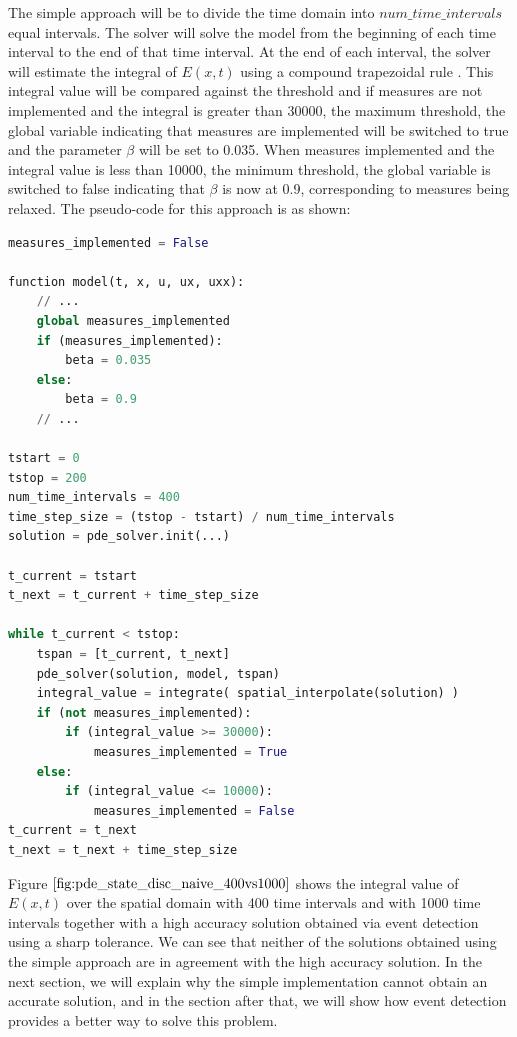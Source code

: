 The simple approach will be to divide the time domain into $num\_time\_intervals$ equal intervals. The solver will solve the model from the beginning of each time interval to the end of that time interval. At the end of each interval, the solver will estimate the integral of $E(x, t)$ using a compound trapezoidal rule \cite{heath2018scientific}. This integral value will be compared against the threshold and if measures are not implemented and the integral is greater than 30000, the maximum threshold, the global variable indicating that measures are implemented will be switched to true and the parameter $\beta$ will be set to 0.035. When measures implemented and the integral value is less than 10000, the minimum threshold, the global variable is switched to false indicating that $\beta$ is now at 0.9, corresponding to measures being relaxed. The pseudo-code for this approach is as shown:

\begin{minipage}{\linewidth}
\begin{lstlisting}[language=Python]
measures_implemented = False

function model(t, x, u, ux, uxx):
	// ...
	global measures_implemented
	if (measures_implemented):
		beta = 0.035
	else:
		beta = 0.9
	// ...

tstart = 0
tstop = 200
num_time_intervals = 400
time_step_size = (tstop - tstart) / num_time_intervals
solution = pde_solver.init(...)

t_current = tstart
t_next = t_current + time_step_size

while t_current < tstop:
	tspan = [t_current, t_next]
	pde_solver(solution, model, tspan)
	integral_value = integrate( spatial_interpolate(solution) )
	if (not measures_implemented):
		if (integral_value >= 30000): 
			measures_implemented = True
	else:
		if (integral_value <= 10000):
			measures_implemented = False
t_current = t_next
t_next = t_next + time_step_size
\end{lstlisting}
\end{minipage} 

Figure $\ref{fig:pde_state_disc_naive_400vs1000}$ shows the integral value of $E(x, t)$ over the spatial domain with 400 time intervals and with 1000 time intervals together with a high accuracy solution obtained via event detection using a sharp tolerance. We can see that neither of the solutions obtained using the simple approach are in agreement with the high accuracy solution. In the next section, we will explain why the simple implementation cannot obtain an accurate solution, and in the section after that, we will show how event detection provides a better way to solve this problem.

